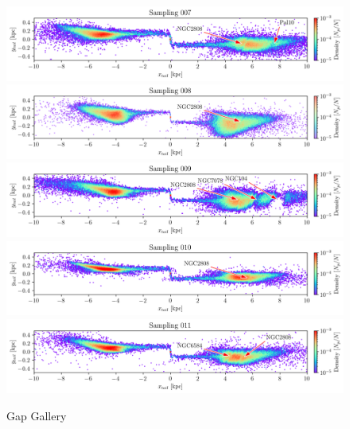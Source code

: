 \documentclass{aa}
\begin{document}
\begin{appendix}
    \begin{figure}
      \centering
      \includegraphics[width=\linewidth]{gallery_of_gaps_monte-carlo-007.png}
      \includegraphics[width=\linewidth]{gallery_of_gaps_monte-carlo-008.png}
      \includegraphics[width=\linewidth]{gallery_of_gaps_monte-carlo-009.png}      
      \includegraphics[width=\linewidth]{gallery_of_gaps_monte-carlo-010.png}
      \includegraphics[width=\linewidth]{gallery_of_gaps_monte-carlo-011.png}
      \caption{Gap Gallery}
      \label{fig:gallery2}
      \end{figure}        



\end{appendix}
\end{document}
